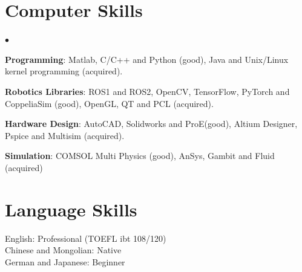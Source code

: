 \documentclass[margin,line]{res}
\newenvironment{list2}{
  \begin{list}{$\bullet$}{%
      \setlength{\itemsep}{0in}
      \setlength{\parsep}{0in} \setlength{\parskip}{0in}
      \setlength{\topsep}{0in} \setlength{\partopsep}{0in} 
      \setlength{\leftmargin}{0.2in}}}{\end{list}}
\begin{document}
\begin{resume}
\section{\sc Computer Skills} 
\begin{list2}
\item {\bf Programming}: Matlab, C/C++ and Python (good), Java and Unix/Linux kernel programming (acquired). \\

\item {\bf Robotics Libraries}: ROS1 and ROS2, OpenCV, TensorFlow, PyTorch and CoppeliaSim (good), OpenGL, QT and PCL (acquired).\\

\item {\bf Hardware Design}: AutoCAD, Solidworks and ProE(good), Altium Designer, Pspice and Multisim (acquired).\\

\item {\bf Simulation}: COMSOL Multi Physics (good), AnSys, Gambit and Fluid (acquired) \\
\end{list2}

\section{\sc Language Skills} 
English: Professional (TOEFL ibt 108/120)\\
Chinese and Mongolian: Native\\
German and Japanese: Beginner




%



\end{resume}
\end{document}
